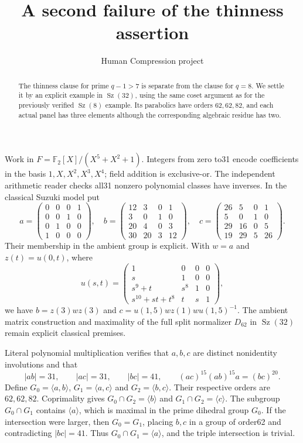 \documentclass[11pt,a4paper]{article}
\title{A second failure of the thinness assertion}
\author{Human Compression project}\date{}
\newcommand{\gen}[1]{\langle#1\rangle}
\newcommand{\Sz}{\operatorname{Sz}}
\begin{document}
\maketitle
\begin{abstract}
The thinness clause for prime $q-1>7$ is separate from the clause for
$q=8$. We settle it by an explicit example in $\Sz(32)$, using the same
coset argument as for the previously verified $\Sz(8)$ example. Its
parabolics have orders $62,62,82$, and each actual panel has three
elements although the corresponding algebraic residue has two.
\end{abstract}

Work in $F=\mathbb F_2[X]/(X^5+X^2+1)$. Integers from zero to31 encode
coefficients in the basis $1,X,X^2,X^3,X^4$; field addition is
exclusive-or. The independent arithmetic reader checks all31 nonzero
polynomial classes have inverses. In the classical Suzuki model put
\[
 a=\begin{pmatrix}0&0&0&1\\0&0&1&0\\0&1&0&0\\1&0&0&0\end{pmatrix},\quad
 b=\begin{pmatrix}12&3&0&1\\3&0&1&0\\20&4&0&3\\30&20&3&12\end{pmatrix},\quad
 c=\begin{pmatrix}26&5&0&1\\5&0&1&0\\29&16&0&5\\19&29&5&26\end{pmatrix}.
\]
Their membership in the ambient group is explicit. With $w=a$ and
$z(t)=u(0,t)$, where
\[
 u(s,t)=\begin{pmatrix}
 1&0&0&0\\s&1&0&0\\s^9+t&s^8&1&0\\s^{10}+st+t^8&t&s&1
 \end{pmatrix},
\]
we have $b=z(3)wz(3)$ and
$c=u(1,5)wz(1)wu(1,5)^{-1}$. The ambient matrix construction and
maximality of the full split normalizer $D_{62}$ in $\Sz(32)$ remain
explicit classical premises.

Literal polynomial multiplication verifies that $a,b,c$ are distinct
nonidentity involutions and that
\[
 |ab|=31,\qquad |ac|=31,\qquad |bc|=41,\qquad
 (ac)^{15}(ab)^{15}a=(bc)^{20}.                         \tag{1}
\]
Define $G_0=\gen{a,b}$, $G_1=\gen{a,c}$ and $G_2=\gen{b,c}$.
Their respective orders are $62,62,82$. Coprimality gives
$G_0\cap G_2=\gen b$ and $G_1\cap G_2=\gen c$.
The subgroup $G_0\cap G_1$ contains $\gen a$, which is maximal in
the prime dihedral group $G_0$. If the intersection were larger,
then $G_0=G_1$, placing $b,c$ in a group of order62 and contradicting
$|bc|=41$. Thus $G_0\cap G_1=\gen a$, and the triple intersection is
trivial.
\end{document}

